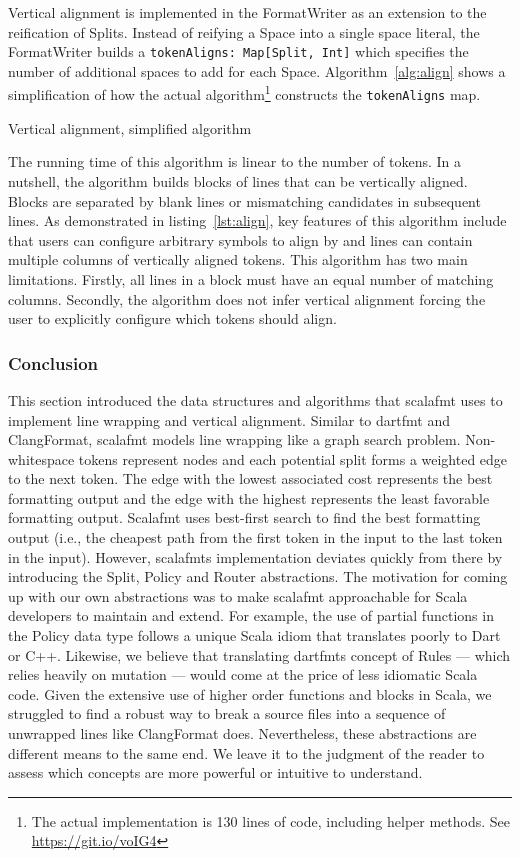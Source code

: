 Vertical alignment is implemented in the FormatWriter as an extension to the reification of Splits.
Instead of reifying a Space into a single space literal,
the FormatWriter builds a \texttt{tokenAligns: Map[Split, Int]} which specifies the number of additional spaces to add for each Space.
Algorithm~\ref{alg:align} shows a simplification of how the actual algorithm\footnote{
  The actual implementation is 130 lines of code, including helper methods. See
\href{https://git.io/voIG4}{https://git.io/voIG4}}
constructs the \texttt{tokenAligns} map.
\begin{algorithm}
  \caption{Vertical alignment, simplified algorithm}\label{alg:align}
  
\end{algorithm}
The running time of this algorithm is linear to the number of tokens.
In a nutshell, the algorithm builds blocks of lines that can be vertically aligned.
Blocks are separated by blank lines or mismatching candidates in subsequent lines.
As demonstrated in listing~\ref{lst:align}, key features of this algorithm include that users can configure arbitrary symbols to align by and lines can contain multiple columns of vertically aligned tokens.
This algorithm has two main limitations.
Firstly, all lines in a block must have an equal number of matching columns.
Secondly, the algorithm does not infer vertical alignment forcing the user to explicitly configure which tokens should align.

\subsubsection{Conclusion}
This section introduced the data structures and algorithms that scalafmt uses to implement line wrapping and vertical alignment.
Similar to dartfmt and ClangFormat, scalafmt models line wrapping like a graph search problem.
Non-whitespace tokens represent nodes and each potential split forms a weighted edge to the next token.
The edge with the lowest associated cost represents the best formatting output and the edge with the highest represents the least favorable formatting output.
Scalafmt uses best-first search to find the best formatting output (i.e., the cheapest path from the first token in the input to the last token in the input).
However, scalafmts implementation deviates quickly from there by introducing the Split, Policy and Router abstractions.
The motivation for coming up with our own abstractions was to make scalafmt approachable for Scala developers to maintain and extend.
For example, the use of partial functions in the Policy data type follows a unique Scala idiom that translates poorly to Dart or C++.
Likewise, we believe that translating dartfmts concept of Rules --- which relies heavily on mutation --- would come at the price of less idiomatic Scala code.
Given the extensive use of higher order functions and blocks in Scala, we struggled to find a robust way to break a source files into a sequence of unwrapped lines like ClangFormat does.
Nevertheless, these abstractions are different means to the same end.
We leave it to the judgment of the reader to assess which concepts are more powerful or intuitive to understand.
